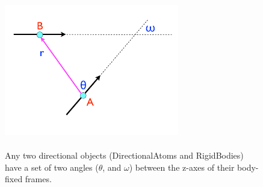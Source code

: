 \documentclass[letterpaper]{report}
\begin{document}
\begin{figure} [H]
\centering
\includegraphics[width=3in]{definition.pdf}
\caption[Definitions of the angles between directional objects]{ \\ Any
two directional objects (DirectionalAtoms and RigidBodies) have a set
of two angles ($\theta$, and $\omega$) between the z-axes of their
body-fixed frames.} 
\label{fig:gofr}
\end{figure}
\end{document}

